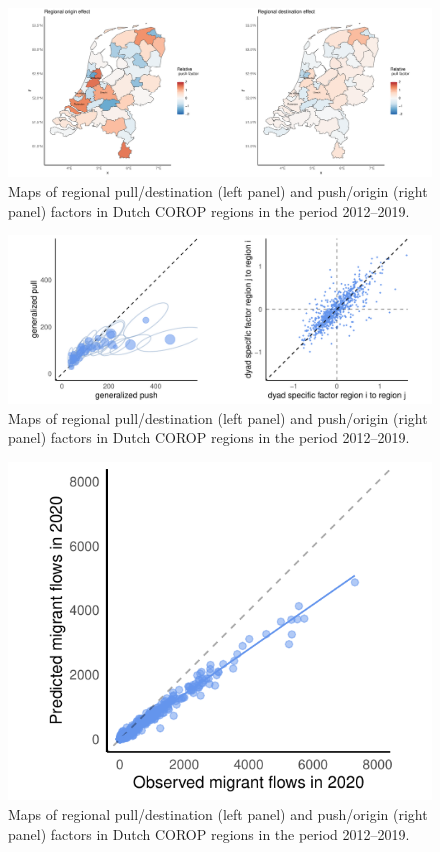 \documentclass[11pt,parskip,abstracton,notitlepage, dvipsnames]{scrartcl}
\begin{document}
\begin{figure}[ht]\centering %
  \includegraphics[width=1.0\linewidth]{./../../fig/attractivity_region.pdf}
  \caption{Maps of regional pull/destination (left panel) and push/origin (right panel) factors in Dutch COROP regions in the period 2012--2019.}
  \label{fig:housing_types}
\end{figure}

\begin{figure}[ht]\centering %
  \includegraphics[width=1.0\linewidth]{./../../fig/country_dyad.pdf}
  \caption{Maps of regional pull/destination (left panel) and push/origin (right panel) factors in Dutch COROP regions in the period 2012--2019.}
  \label{fig:housing_types}
\end{figure}

\begin{figure}[ht]\centering %
  \includegraphics[width=0.5\linewidth]{./../../fig/prediction_2020.pdf}
  \caption{Maps of regional pull/destination (left panel) and push/origin (right panel) factors in Dutch COROP regions in the period 2012--2019.}
  \label{fig:housing_types}
\end{figure}
\end{document}
